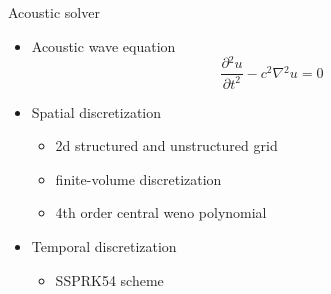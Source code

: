 \documentclass[10pt, aspectratio=169]{beamer}
\begin{document}
\begin{frame}{Acoustic solver}
	\begin{itemize}
		\item Acoustic wave equation
		\begin{equation}
			\frac{\partial{}^{2}{u}}{\partial{t}^{2}}- c^{2}\nabla{}^{2}{u}=0
		\end{equation} 
		\item Spatial discretization 
		\begin{itemize} 
			\item 2d structured and unstructured grid
			\item finite-volume discretization
			\item 4th order central weno polynomial
		\end{itemize}
		\item Temporal discretization
		\begin{itemize} 
			\item SSPRK54 scheme
		\end{itemize}
	\end{itemize}
\end{frame}
\end{document}
